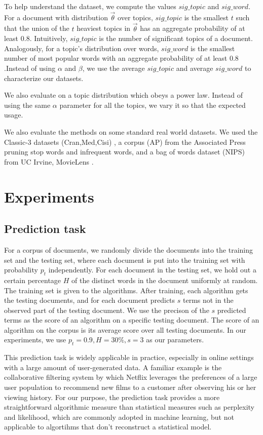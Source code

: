\documentclass{sig-alternate}
\begin{document}
To help understand the dataset, we compute the values $sig\_topic$ and
$sig\_word$. For a document with distribution $\vec{\theta}$ over
topics, $sig\_topic$ is the smallest $t$ such that the union of the
$t$ heaviest topics in $\vec{\theta}$ has an aggregate probability of
at least $0.8$. Intuitively, $sig\_topic$ is the number of significant
topics of a document. Analogously, for a topic's distribution over
words, $sig\_word$ is the smallest number of most popular words with
an aggregate probability of at least $0.8$.Instead of using $\alpha$
and $\beta$, we use the average $sig\_topic$ and average $sig\_word$
to characterize our datasets.


We also evaluate on a topic distribution which obeys a power 
law.  Instead of using the same $\alpha$ parameter for all
the topics, we vary it so that the expected usage.

We also evaluate the methods on some standard real world datasets.  We
used the Classic-3 datasets (Cran,Med,Cisi) \cite{Classic3}, a corpus
(AP) from the Associated Press \cite{AP} pruning stop words and
infrequent words, and a bag of words dataset (NIPS) from UC
Irvine\cite{KosNIPS}, MovieLens \cite{MovieLens}.

\section{Experiments}
\subsection{Prediction task}

For a corpus of documents, we randomly divide the documents into the
training set and the testing set, where each document is put into the
training set with probability $p_t$ independently. For each document
in the testing set, we hold out a certain percentage $H$ of the
distinct words in the document uniformly at random. The training set
is given to the algorithms. After training, each algorithm gets the
testing documents, and for each document predicts $s$ terms not in the
observed part of the testing document. We use the precison of the $s$
predicted terms as the score of an algorithm on a specific testing
document. The score of an algorithm on the corpus is its average score
over all testing documents. In our experiments, we use $p_t=0.9,
H=30\%,s=3$ as our parameters.

This prediction task is widely applicable in practice, especially in
online settings with a large amount of user-generated data. A familiar
example is the collaborative filtering system by which Netflix
leverages the preferences of a large user population to recommend new
films to a customer after observing his or her viewing history. For
our purpose, the prediction task provides a more straightforward
algorithmic measure than statistical measures such as perplexity and
likelihood, which are commonly adopted in machine learning, but not
applicable to algortihms that don't reconstruct a statistical model.
\end{document}
